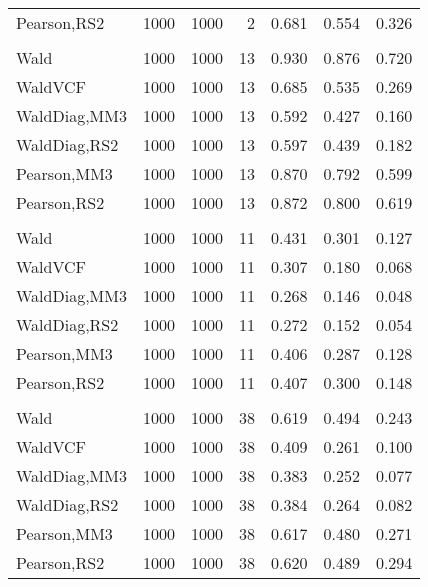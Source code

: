 \documentclass[
]{article}
\begin{document}
\begin{table}[H]
{\begin{tabular}[t]{lrrrrrr}
\hspace{1em}Pearson,RS2 & 1000 & 1000 & 2 & 0.681 & 0.554 & 0.326\\
\addlinespace[0.3em]
\multicolumn{7}{l}{\textbf{1F 15V}}\\
\hspace{1em}Wald & 1000 & 1000 & 13 & 0.930 & 0.876 & 0.720\\
\hspace{1em}WaldVCF & 1000 & 1000 & 13 & 0.685 & 0.535 & 0.269\\
\hspace{1em}WaldDiag,MM3 & 1000 & 1000 & 13 & 0.592 & 0.427 & 0.160\\
\hspace{1em}WaldDiag,RS2 & 1000 & 1000 & 13 & 0.597 & 0.439 & 0.182\\
\hspace{1em}Pearson,MM3 & 1000 & 1000 & 13 & 0.870 & 0.792 & 0.599\\
\hspace{1em}Pearson,RS2 & 1000 & 1000 & 13 & 0.872 & 0.800 & 0.619\\
\addlinespace[0.3em]
\multicolumn{7}{l}{\textbf{2F 10V}}\\
\hspace{1em}Wald & 1000 & 1000 & 11 & 0.431 & 0.301 & 0.127\\
\hspace{1em}WaldVCF & 1000 & 1000 & 11 & 0.307 & 0.180 & 0.068\\
\hspace{1em}WaldDiag,MM3 & 1000 & 1000 & 11 & 0.268 & 0.146 & 0.048\\
\hspace{1em}WaldDiag,RS2 & 1000 & 1000 & 11 & 0.272 & 0.152 & 0.054\\
\hspace{1em}Pearson,MM3 & 1000 & 1000 & 11 & 0.406 & 0.287 & 0.128\\
\hspace{1em}Pearson,RS2 & 1000 & 1000 & 11 & 0.407 & 0.300 & 0.148\\
\addlinespace[0.3em]
\multicolumn{7}{l}{\textbf{3F 15V}}\\
\hspace{1em}Wald & 1000 & 1000 & 38 & 0.619 & 0.494 & 0.243\\
\hspace{1em}WaldVCF & 1000 & 1000 & 38 & 0.409 & 0.261 & 0.100\\
\hspace{1em}WaldDiag,MM3 & 1000 & 1000 & 38 & 0.383 & 0.252 & 0.077\\
\hspace{1em}WaldDiag,RS2 & 1000 & 1000 & 38 & 0.384 & 0.264 & 0.082\\
\hspace{1em}Pearson,MM3 & 1000 & 1000 & 38 & 0.617 & 0.480 & 0.271\\
\hspace{1em}Pearson,RS2 & 1000 & 1000 & 38 & 0.620 & 0.489 & 0.294\\
\bottomrule
\end{tabular}}
\endgroup{}
\end{table}
\end{document}

